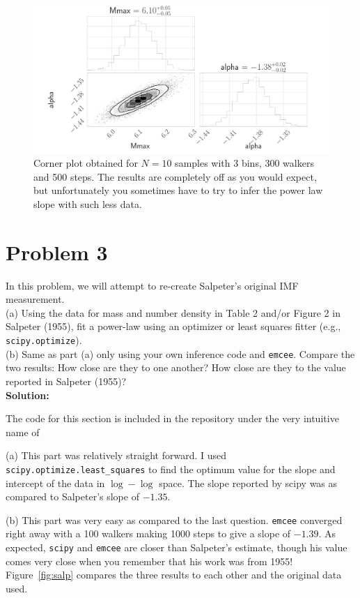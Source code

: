 \documentclass[12pt,usletter,english]{article}
\begin{document}
\begin{figure}[!h]
  \centering \includegraphics[width=13cm]{theta_1e1.png}
  \caption{Corner plot obtained for $N=10$ samples with 3 bins, 300
    walkers and 500 steps. The results are completely off as you would
    expect, but unfortunately you sometimes have to try to infer the
    power law slope with such less data. 
    \label{fig:corner_1e1}}
\end{figure}


\section{Problem 3}

In this problem, we will attempt to re-create Salpeter's original IMF
measurement.  \\

(a) Using the data for mass and number density in Table 2 and/or
Figure 2 in Salpeter (1955), fit a power-law using an optimizer or
least squares fitter (e.g., \texttt{scipy.optimize}).\\

(b) Same as part (a) only using your own inference code and
\texttt{emcee}.  Compare the two results: How close are they to one
another? How close are they to the value reported in Salpeter (1955)?
\\

\noindent \textbf{Solution:}

The code for this section is included in the repository under the very
intuitive name of 

(a) This part was relatively straight forward. I used
\texttt{scipy.optimize.least\_squares} to find the optimum value for
the slope and intercept of the data in $\log-\log$ space. The slope
reported by scipy was  as compared to Salpeter's slope of
$-1.35$.

(b) This part was very easy as compared to the last
question. \texttt{emcee} converged right away with a 100 walkers
making 1000 steps to give a slope of $-1.39$. As expected,
\texttt{scipy} and \texttt{emcee} are closer than Salpeter's estimate,
though his value comes very close when you remember that his work was
from 1955! Figure~\ref{fig:salp} compares the three results to each
other and the original data used.
\end{document}
